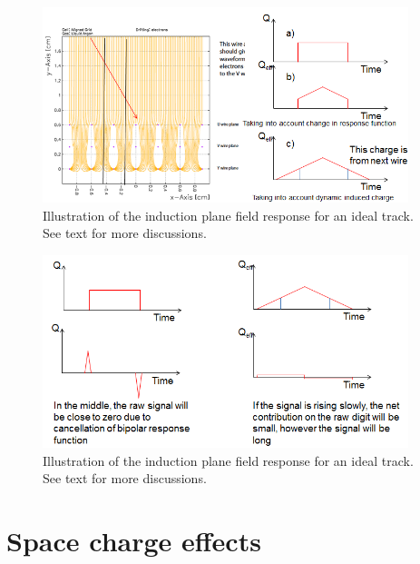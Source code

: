\begin{figure}[!h!tbp]
\includegraphics[width=0.95\textwidth]{figures/ideal_track.png}
\caption{Illustration of the induction plane field response for an ideal track. See text for more 
discussions. }
\label{fig:ideal_track_1}
\end{figure}

\begin{figure}[!h!tbp]
\includegraphics[width=0.95\textwidth]{figures/ideal_track_2.png}
\caption{Illustration of the induction plane field response for an ideal track. See text for more 
discussions.}
\label{fig:ideal_track_2}
\end{figure}




\section{Space charge effects}

